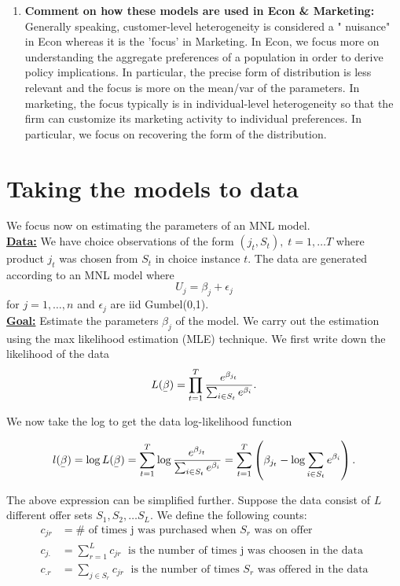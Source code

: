 \documentclass[11pt]{article}
\newcommand{\ubar}[1]{\underaccent{\bar}{#1}}
\begin{document}
\begin{enumerate}
\item {\bf Comment on how these models are used in Econ \& Marketing:}
Generally speaking, customer-level heterogeneity is considered a " nuisance" in Econ whereas it is the 'focus' in Marketing. In Econ, we focus more on understanding the aggregate preferences of a population in order to derive policy implications. In particular, the precise form of distribution is less relevant and the focus is more on the mean/var of the parameters.
In marketing, the focus typically is in individual-level heterogeneity so that the firm can customize its marketing activity to individual preferences. In particular, we focus on recovering the form of the distribution.

\end{enumerate}

\section{Taking the models to data}
We focus now on estimating the parameters of an MNL model.\\


\underline{\bf Data:} We have choice observations of the form $(j_t, S_t), \; t=1, \ldots T$ where product $j_t$ was chosen from $S_t$ in choice instance $t$. The data are generated according to an MNL model where $$ U_j = \beta_j + \epsilon_j $$ for $j=1, \ldots, n$ and $ \epsilon_j$ are iid Gumbel(0,1).\\


\underline{\bf Goal:} Estimate the parameters $\beta_j$ of the model. We carry out the estimation using the max likelihood estimation (MLE) technique. We first write down the likelihood of the data 
$$ L ( \ubar \beta ) = \prod_{t=1}^T \frac{e^{ \beta_{j_t}}}{\sum_{i \in S_t} e^{\beta_i}}.$$

We now take the log to get the data log-likelihood function

$$ l ( \ubar \beta ) = \log  L ( \ubar \beta ) = \sum_{t=1}^T  \log \frac{e^{ \beta_{j_t}}}{\sum_{i \in S_t} e^{\beta_i}} =  \sum_{t=1}^T \left( \beta_{j_t} - \log \sum_{i \in S_t} e^{\beta_i} \right). $$

The above expression can be simplified further. Suppose the data consist of $L$ different offer sets $S_1, S_2,\ldots S_L$. We define the following counts:
\begin{align*}
 c_{jr} &= \#\text { of times j was purchased when $S_r$ was on offer} \\
 c_{j.}& = \sum_{r=1}^L c_{jr} \; \text { is the number of times j was choosen in the data} \\
 c_{.r} &= \sum_{j \in S_r}c_{jr} \; \text { is the number of times $S_r$ was offered in the data} 
\end{align*}
\end{document}
